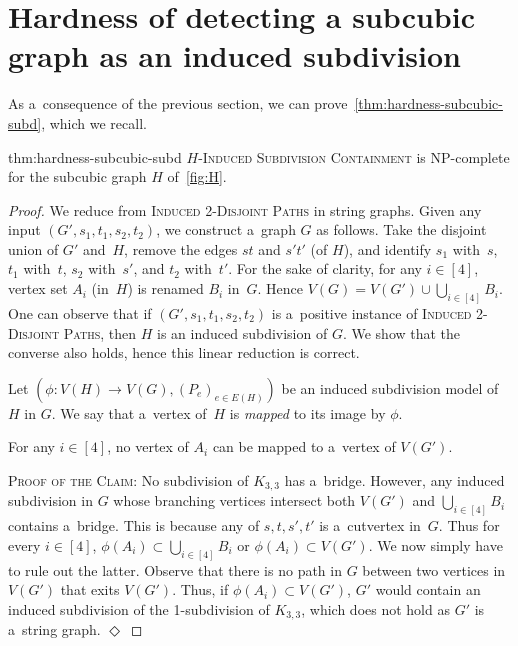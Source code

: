 \documentclass[a4paper,UKenglish,cleveref,autoref]{lipics-v2021}
\newenvironment{proofofclaim}{\noindent \textsc{Proof of the Claim:}}{\unskip\nobreak\hfill$\Diamond$\medskip}
\begin{document}
\section{Hardness of detecting a subcubic graph as an induced subdivision}\label{sec:isc-imc}

As a~consequence of the previous section, we can prove~\cref{thm:hardness-subcubic-subd}, which we recall.

\begin{reptheorem}{thm:hardness-subcubic-subd}
  \textsc{$H$-Induced Subdivision Containment} is NP-complete for the subcubic graph $H$ of~\cref{fig:H}.
\end{reptheorem}

\begin{proof}
  We reduce from \textsc{Induced 2-Disjoint Paths} in string graphs.
  Given any input $(G', s_1, t_1, s_2, t_2)$, we construct a~graph $G$ as follows.
  Take the disjoint union of $G'$ and~$H$, remove the edges $st$ and $s't'$ (of $H$), and identify $s_1$ with~$s$, $t_1$ with~$t$, $s_2$ with~$s'$, and $t_2$ with~$t'$.
  For the sake of clarity, for any $i \in [4]$, vertex set $A_i$ (in~$H$) is renamed $B_i$ in~$G$.
  Hence $V(G) = V(G') \cup \bigcup_{i \in [4]} B_i$.
  One can observe that if $(G', s_1, t_1, s_2, t_2)$ is a~positive instance of \textsc{Induced 2-Disjoint Paths}, then $H$ is an induced subdivision of $G$.
  We show that the converse also holds, hence this linear reduction is correct.

  Let $(\phi: V(H) \to V(G), (P_e)_{e \in E(H)})$ be an induced subdivision model of $H$ in $G$.
  We say that a~vertex of~$H$ is \emph{mapped} to its image by $\phi$.
  
  \begin{claim}\label{clm:anchor}
    For any $i \in [4]$, no vertex of $A_i$ can be mapped to a~vertex of $V(G')$.
  \end{claim}
  \begin{proofofclaim}
    No subdivision of $K_{3,3}$ has a~bridge.
    However, any induced subdivision in $G$ whose branching vertices intersect both $V(G')$ and $\bigcup_{i \in [4]} B_i$ contains a~bridge.
    This is because any of $s, t, s', t'$ is a~cutvertex in~$G$. 
    Thus for every $i \in [4]$, $\phi(A_i) \subset \bigcup_{i \in [4]} B_i$ or $\phi(A_i) \subset V(G')$.
    We now simply have to rule out the latter.
    Observe that there is no path in $G$ between two vertices in $V(G')$ that exits $V(G')$.
    Thus, if $\phi(A_i) \subset V(G')$, $G'$ would contain an induced subdivision of the 1-subdivision of $K_{3,3}$, which does not hold as $G'$ is a~string graph.
  \end{proofofclaim}


\end{proof}
\end{document}
